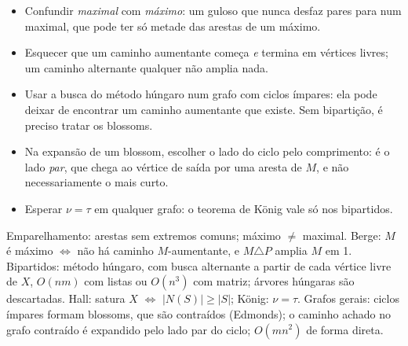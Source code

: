 \begin{exemplo}
\begin{figura}
\end{figura}
\end{exemplo}

\begin{cuidado}
\begin{itemize}
  \item Confundir \emph{maximal} com \emph{máximo}: um guloso que nunca desfaz pares para num maximal, que pode ter só metade das arestas de um máximo.
  \item Esquecer que um caminho aumentante começa \emph{e} termina em vértices livres; um caminho alternante qualquer não amplia nada.
  \item Usar a busca do método húngaro num grafo com ciclos ímpares: ela pode deixar de encontrar um caminho aumentante que existe. Sem bipartição, é preciso tratar os blossoms.
  \item Na expansão de um blossom, escolher o lado do ciclo pelo comprimento: é o lado \emph{par}, que chega ao vértice de saída por uma aresta de $M$, e não necessariamente o mais curto.
  \item Esperar $\nu=\tau$ em qualquer grafo: o teorema de König vale só nos bipartidos.
\end{itemize}
\end{cuidado}

\begin{chave}
Emparelhamento: arestas sem extremos comuns; máximo $\ne$ maximal. Berge: $M$ é máximo $\iff$ não há caminho $M$-aumentante, e $M\triangle P$ amplia $M$ em 1. Bipartidos: método húngaro, com busca alternante a partir de cada vértice livre de $X$, $O(nm)$ com listas ou $O(n^3)$ com matriz; árvores húngaras são descartadas. Hall: satura $X$ $\iff$ $|N(S)|\ge|S|$; König: $\nu=\tau$. Grafos gerais: ciclos ímpares formam blossoms, que são contraídos (Edmonds); o caminho achado no grafo contraído é expandido pelo lado par do ciclo; $O(mn^2)$ de forma direta.
\end{chave}

